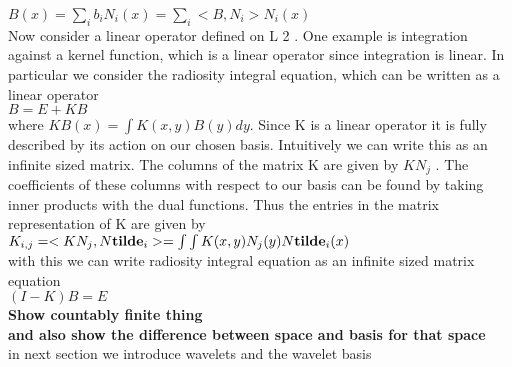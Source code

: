 $B(x) = \sum_ib_iN_i(x)= \sum_i<B,N_i>N_i(x)$\\

Now consider a linear operator defined on L 2 . One example is
integration against a kernel function, which is a linear operator since integration is linear. In particular we consider the radiosity
integral equation, which can be written as a linear operator\\

$B=E+KB$\\

where $KB(x) = \int K(x, y)B(y)dy$. Since K is a linear operator it
is fully described by its action on our chosen basis. Intuitively we
can write this as an infinite sized matrix. The columns of the matrix K are given by $KN_j$ . The coefficients of these columns with
respect to our basis can be found by taking inner products with
the dual functions. Thus the entries in the matrix representation
of K are given by\\

$K_{i,j}=<KN_j,N{\bf tilde}_i>=\int \int K(x,y)N_j(y)N{\bf tilde}_i(x)$\\

with this we can write radiosity integral equation as an infinite sized matrix equation\\

$(I-K)B=E$\\

{\bf Show countably finite thing \\ and also show the difference between space and basis for that space}\\

in next section we introduce wavelets and the wavelet basis
\\\\